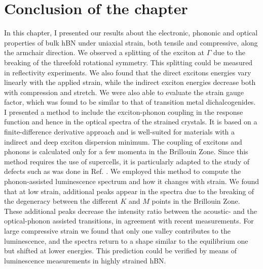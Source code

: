 %
\section*{Conclusion of the chapter}
In this chapter, I presented our results about the electronic, phononic and optical properties of bulk hBN under uniaxial strain, both tensile and compressive, along the armchair direction. We observed a splitting of the exciton at $\Gamma$ due to the breaking
of the threefold rotational symmetry. This splitting could be measured in reflectivity experiments.\cite{elias2021flat} We also found that the direct excitons energies vary linearly with the applied strain, while the indirect exciton energies decrease both with compression and stretch. We were also able to evaluate the strain gauge factor, which was found to be similar to that of transition metal dichalcogenides.
I presented a method to include the exciton-phonon coupling in the response function and hence in the optical spectra of the strained crystals. It is based on a finite-difference derivative approach and is well-suited for materials with a indirect and deep exciton dispersion minimum. The coupling of excitons and phonons is calculated only for a few momenta in the Brillouin Zone. Since this method requires the use of supercells, it is particularly adapted to the study of defects such as was done in Ref. \cite{libbi2022phonon}. We employed this method to compute the phonon-assisted luminescence spectrum and how it changes with strain. We found that at low strain, additional peaks appear in the spectra due to the breaking of the degeneracy between the different $K$ and $M$ points in the Brillouin Zone. These additional peaks decrease the intensity ratio between the acoustic- and the optical-phonon assisted transitions, in agreement with recent measurements. For large compressive strain we found that only one valley contributes to the luminescence, and the spectra return to a shape similar to the equilibrium one but shifted at lower energies. This prediction could be verified by means of luminescence measurements in highly strained \acrshort{hBN}.\cite{blundo2022vibrational}

